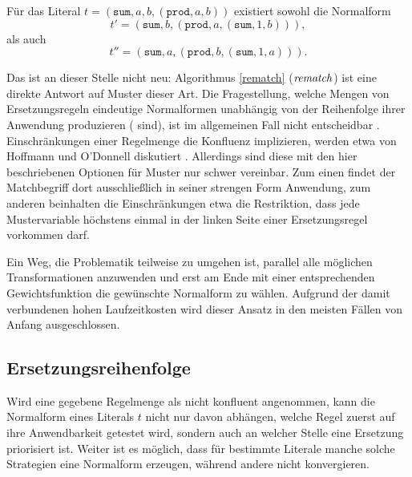 Für das Literal $t = (\texttt{sum}, a, b, (\texttt{prod}, a, b))$ existiert sowohl die Normalform 
$$t' = (\texttt{sum}, b, (\texttt{prod}, a, (\texttt{sum}, 1, b))),$$ 
als auch 
$$t'' = (\texttt{sum}, a, (\texttt{prod}, b, (\texttt{sum}, 1, a))).$$

Das ist an dieser Stelle nicht neu: Algorithmus \ref{rematch} ($\mathit{rematch}$) ist eine direkte Antwort auf Muster dieser Art. Die Fragestellung, welche Mengen von Ersetzungsregeln eindeutige Normalformen unabhängig von der Reihenfolge ihrer Anwendung produzieren ( sind), ist im allgemeinen Fall nicht entscheidbar \cite{KonfluenzUnentscheidbar}.
Einschränkungen einer Regelmenge die Konfluenz implizieren, werden etwa von Hoffmann und O'Donnell diskutiert \cite{hoffmann1982programming}. Allerdings sind diese mit den hier beschriebenen Optionen für Muster nur schwer vereinbar. Zum einen findet der Matchbegriff dort ausschließlich in seiner strengen Form Anwendung, zum anderen beinhalten die Einschränkungen etwa die Restriktion, dass jede Mustervariable höchstens einmal in der linken Seite einer Ersetzungsregel vorkommen darf.

Ein Weg, die Problematik teilweise zu umgehen ist, parallel alle möglichen Transformationen anzuwenden und erst am Ende mit einer entsprechenden Gewichtsfunktion die gewünschte Normalform zu wählen. Aufgrund der damit verbundenen hohen Laufzeitkosten wird dieser Ansatz in den meisten Fällen von Anfang ausgeschlossen.


\subsection{Ersetzungsreihenfolge}
Wird eine gegebene Regelmenge als nicht konfluent angenommen, kann die  Normalform eines Literals $t$ nicht nur davon abhängen, welche Regel zuerst auf ihre Anwendbarkeit getestet wird, sondern auch an welcher Stelle eine Ersetzung priorisiert ist. Weiter ist es möglich, dass für bestimmte Literale manche solche Strategien eine Normalform erzeugen, während andere nicht konvergieren.

